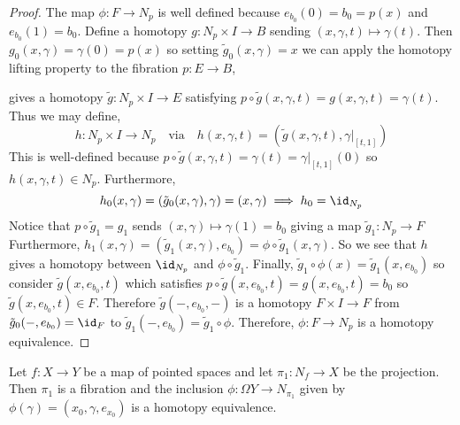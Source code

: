 \documentclass[12pt]{extarticle}
\begin{document}
\begin{proof} \label{fibrationgiveshomotopyfiber}
The map $\phi : F \to N_p$ is well defined because $e_{b_0}(0) = b_0 = p(x)$ and $e_{b_0}(1) = b_0$. Define a homotopy $g : N_p \times I \to B$ sending $(x, \gamma, t) \mapsto \gamma(t)$. Then $g_0(x, \gamma) = \gamma(0) = p(x)$ so setting $\tilde{g}_0(x, \gamma) = x$ we can apply the homotopy lifting property to the fibration $p : E \to B$,
\begin{center}
\end{center}
gives a homotopy $\tilde{g} : N_p \times I \to E$ satisfying $p \circ \tilde{g}(x, \gamma, t) = g(x, \gamma, t) = \gamma(t)$. Thus we may define,
\[ h : N_p \times I \to N_p \quad \text{via} \quad h(x, \gamma, t) = (\tilde{g}(x, \gamma, t), \gamma|_{[t, 1]}) \]
This is well-defined because $p \circ \tilde{g}(x, \gamma, t) = \gamma(t) = \gamma|_{[t, 1]}(0)$ so $h(x, \gamma, t) \in N_p$. Furthermore, 
\[ h_0(x, \gamma) = (\tilde{g}_0(x, \gamma), \gamma) = (x, \gamma) \implies h_0 = \id_{N_p} \]
Notice that $p \circ \tilde{g}_1 = g_1$ sends $(x, \gamma) \mapsto \gamma(1) = b_0$ giving a map $\tilde{g}_1 : N_p \to F$
Furthermore, $h_1(x, \gamma) = (\tilde{g}_1(x, \gamma), e_{b_0}) = \phi \circ \tilde{g}_1(x, \gamma)$. So we see that $h$ gives a homotopy between $\id_{N_p}$ and $\phi \circ \tilde{g}_1$. Finally, $\tilde{g}_1 \circ \phi(x) = \tilde{g}_1(x, e_{b_0})$ so consider $\tilde{g}(x, e_{b_0}, t)$ which satisfies $p \circ \tilde{g}(x, e_{b_0}, t) = g(x, e_{b_0}, t) = b_0$ so $\tilde{g}(x, e_{b_0}, t) \in F$. Therefore $\tilde{g}(-, e_{b_0}, -)$ is a homotopy $F \times I \to F$ from $\tilde{g}_0(-, e_{b_0}) = \id_F$ to $\tilde{g}_1(-, e_{b_0}) = \tilde{g}_1 \circ \phi$. Therefore, $\phi : F \to N_p$ is a homotopy equivalence.
\end{proof}

\begin{lemma} \label{mappingcoclyinderhasfibration}
Let $f : X \to Y$ be a map of pointed spaces and let $\pi_1 : N_f \to X$ be the projection. Then $\pi_1$ is a fibration and the inclusion $\phi : \Omega Y \to N_{\pi_1}$ given by $\phi(\gamma) = (x_0, \gamma, e_{x_0})$ is a homotopy equivalence.
\end{lemma}
\end{document}
